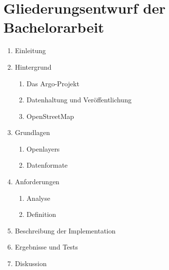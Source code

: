 \section{Gliederungsentwurf der Bachelorarbeit}


\begin{enumerate}
 \item Einleitung
 \item Hintergrund
 \begin{enumerate}
  \item Das Argo-Projekt
  \item Datenhaltung und Veröffentlichung
  \item OpenStreetMap
 \end{enumerate}
 \item Grundlagen
 \begin{enumerate}
  \item Openlayers
  \item Datenformate
 \end{enumerate}
 \item Anforderungen
 \begin{enumerate}
  \item Analyse
  \item Definition
 \end{enumerate}
 \item Beschreibung der Implementation
 \item Ergebnisse und Tests
 \item Diskussion
\end{enumerate}

